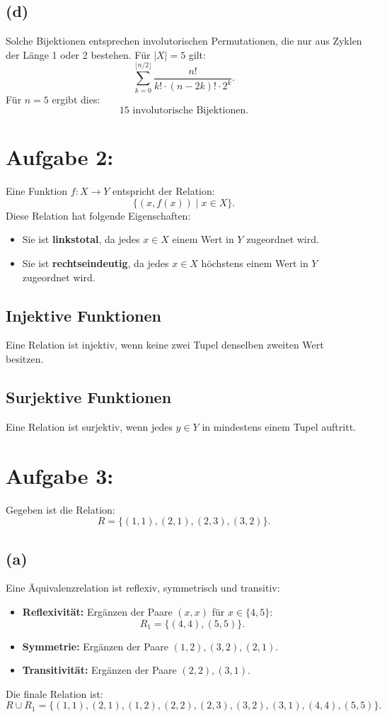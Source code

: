 \documentclass[a4paper]{scrartcl}
\begin{document}
\subsection*{(d)}
Solche Bijektionen entsprechen involutorischen Permutationen, die nur aus Zyklen der Länge 1 oder 2 bestehen. Für \( |X| = 5 \) gilt:
\[
\sum_{k=0}^{\lfloor n/2 \rfloor} \frac{n!}{k! \cdot (n-2k)! \cdot 2^k}.
\]
Für \( n = 5 \) ergibt dies:
\[
15 \text{ involutorische Bijektionen.}
\]

\section*{Aufgabe 2:}
Eine Funktion \( f : X \to Y \) entspricht der Relation:
\[
\{(x, f(x)) \mid x \in X\}.
\]
Diese Relation hat folgende Eigenschaften:
\begin{itemize}
    \item Sie ist \textbf{linkstotal}, da jedes \( x \in X \) einem Wert in \( Y \) zugeordnet wird.
    \item Sie ist \textbf{rechtseindeutig}, da jedes \( x \in X \) höchstens einem Wert in \( Y \) zugeordnet wird.
\end{itemize}

\subsection*{Injektive Funktionen}
Eine Relation ist injektiv, wenn keine zwei Tupel denselben zweiten Wert besitzen.

\subsection*{Surjektive Funktionen}
Eine Relation ist surjektiv, wenn jedes \( y \in Y \) in mindestens einem Tupel auftritt.

\section*{Aufgabe 3:}
Gegeben ist die Relation:
\[
R = \{(1, 1), (2, 1), (2, 3), (3, 2)\}.
\]

\subsection*{(a)}
Eine Äquivalenzrelation ist reflexiv, symmetrisch und transitiv:
\begin{itemize}
    \item \textbf{Reflexivität:} Ergänzen der Paare \((x, x)\) für \( x \in \{4, 5\} \): 
    \[
    R_1 = \{(4, 4), (5, 5)\}.
    \]
    \item \textbf{Symmetrie:} Ergänzen der Paare \((1, 2), (3, 2), (2, 1)\).
    \item \textbf{Transitivität:} Ergänzen der Paare \((2, 2), (3, 1)\).
\end{itemize}
Die finale Relation ist:
\[
R \cup R_1 = \{(1, 1), (2, 1), (1, 2), (2, 2), (2, 3), (3, 2), (3, 1), (4, 4), (5, 5)\}.
\]
\end{document}

